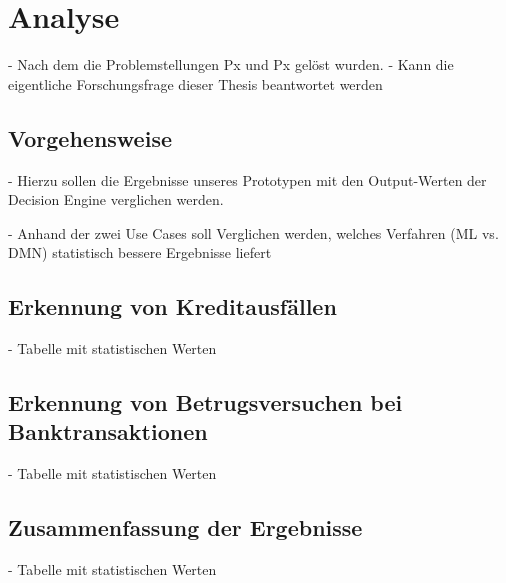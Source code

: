 \chapter{Analyse}
- Nach dem die Problemstellungen Px und Px gelöst wurden. 
- Kann die eigentliche Forschungsfrage dieser Thesis beantwortet werden

\section{Vorgehensweise}
- Hierzu sollen die Ergebnisse unseres Prototypen mit den Output-Werten der Decision Engine verglichen werden.

- Anhand der zwei Use Cases soll Verglichen werden, welches Verfahren (ML vs. DMN) statistisch bessere Ergebnisse liefert

\section{Erkennung von Kreditausfällen}
- Tabelle mit statistischen Werten 

\section{Erkennung von Betrugsversuchen bei Banktransaktionen}
- Tabelle mit statistischen Werten 

\section{Zusammenfassung der Ergebnisse}
- Tabelle mit statistischen Werten 